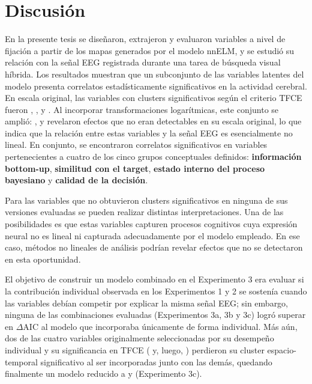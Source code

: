 \chapter{Discusión}
\label{ch:discusion}


En la presente tesis se diseñaron, extrajeron y evaluaron variables a nivel de fijación a partir de los mapas generados por el modelo nnELM, y se estudió su relación con la señal EEG registrada durante una tarea de búsqueda visual híbrida. Los resultados muestran que un subconjunto de las variables latentes del modelo presenta correlatos estadísticamente significativos en la actividad cerebral. En escala original, las variables con clusters significativos según el criterio TFCE fueron , ,  y . Al incorporar transformaciones logarítmicas, este conjunto se amplió: ,  y  revelaron efectos que no eran detectables en su escala original, lo que indica que la relación entre estas variables y la señal EEG es esencialmente no lineal. En conjunto, se encontraron correlatos significativos en variables pertenecientes a cuatro de los cinco grupos conceptuales definidos: \textbf{información bottom-up}, \textbf{similitud con el target}, \textbf{estado interno del proceso bayesiano} y \textbf{calidad de la decisión}.

Para las variables que no obtuvieron clusters significativos en ninguna de sus versiones evaluadas se pueden realizar distintas interpretaciones. Una de las posibilidades es que estas variables capturen procesos cognitivos cuya expresión neural no es lineal ni capturada adecuadamente por el modelo empleado. En ese caso, métodos no lineales de análisis podrían revelar efectos que no se detectaron en esta oportunidad. 

El objetivo de construir un modelo combinado en el Experimento 3 era evaluar si la contribución individual observada en los Experimentos 1 y 2 se sostenía cuando las variables debían competir por explicar la misma señal EEG; sin embargo, ninguna de las combinaciones evaluadas (Experimentos 3a, 3b y 3c) logró superar en $\Delta$AIC al modelo que incorporaba únicamente  de forma individual. Más aún, dos de las cuatro variables originalmente seleccionadas por su desempeño individual y su significancia en TFCE ( y, luego, ) perdieron su cluster espacio-temporal significativo al ser incorporadas junto con las demás, quedando finalmente un modelo reducido a  y  (Experimento 3c).

